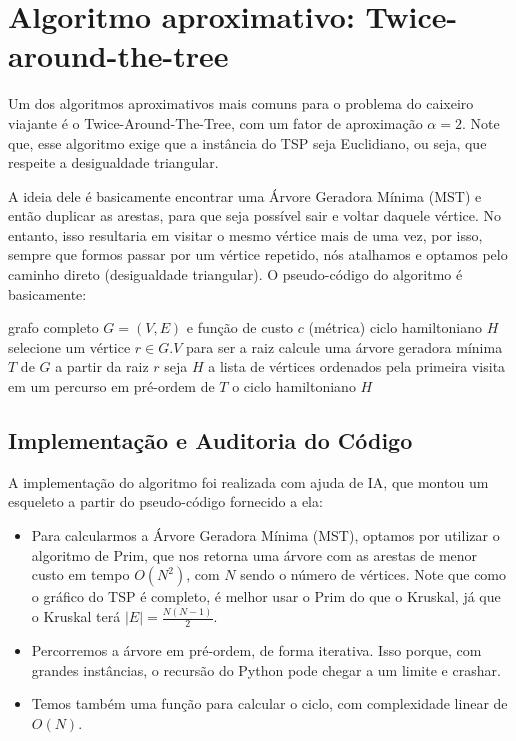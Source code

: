 \documentclass[12pt]{article}
\begin{document}
\section{Algoritmo aproximativo: Twice-around-the-tree}
Um dos algoritmos aproximativos mais comuns para o problema do caixeiro viajante é o Twice-Around-The-Tree, com um fator de aproximação $\alpha = 2$. Note que, esse algoritmo exige que a instância do TSP seja Euclidiano, ou seja, que respeite a desigualdade triangular.

A ideia dele é basicamente encontrar uma Árvore Geradora Mínima (MST) e então duplicar as arestas, para que seja possível sair e voltar daquele vértice. No entanto, isso resultaria em visitar o mesmo vértice mais de uma vez, por isso, sempre que formos passar por um vértice repetido, nós atalhamos e optamos pelo caminho direto (desigualdade triangular).  O pseudo-código do algoritmo é basicamente:

\renewcommand{\algorithmicrequire}{\textbf{Entrada:}}
\renewcommand{\algorithmicensure}{\textbf{Saída:}}
\renewcommand{\algorithmicreturn}{\textbf{retorne}}

\begin{algorithm}[H]
\caption{Approx-TSP-Tour$(G, c)$}
\begin{algorithmic}
\Require grafo completo $G=(V,E)$ e função de custo $c$ (métrica)
\Ensure ciclo hamiltoniano $H$
\State selecione um vértice $r \in G.V$ para ser a raiz
\State calcule uma árvore geradora mínima $T$ de $G$ a partir da raiz $r$
\State seja $H$ a lista de vértices ordenados pela primeira visita
       em um percurso em pré-ordem de $T$
\State \Return o ciclo hamiltoniano $H$
\end{algorithmic}
\end{algorithm}

\subsection{Implementação e Auditoria do Código}
A implementação do algoritmo foi realizada com ajuda de IA, que montou um esqueleto a partir do pseudo-código fornecido a ela:
\begin{itemize}
    \item Para calcularmos a Árvore Geradora Mínima (MST), optamos por utilizar o algoritmo de Prim, que nos retorna uma árvore com as arestas de menor custo em tempo $O(N^2)$, com $N$ sendo o número de vértices. Note que como o gráfico do TSP é completo, é melhor usar o Prim do que o Kruskal, já que o Kruskal terá $|E| = \frac{N(N-1)}{2}$.
    \item Percorremos a árvore em pré-ordem, de forma iterativa. Isso porque, com grandes instâncias, o recursão do Python pode chegar a um limite e crashar.
    \item Temos também uma função para calcular o ciclo, com complexidade linear de $O(N)$.
\end{itemize}
\end{document}
